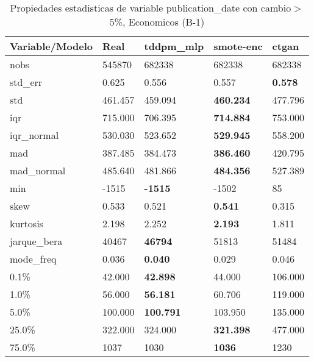 \begin{table}[H]
\centering
\fontsize{8}{14}\selectfont
\caption{Propiedades estadisticas de variable publication\_date con cambio\ensuremath{>}5\%, Economicos (B-1)}
\label{table-stats-economicos-b-1-publication_date-short}
\begin{tabular}{|l|m{10em}|m{10em}|m{10em}|m{10em}|}
\hline
 \rowcolor[gray]{0.8}
Variable/Modelo & Real & tddpm\_mlp & smote-enc & ctgan \\
\hline nobs & 545870 & 682338 & 682338 & 682338 \\
\hline std\_err & 0.625 & \cellcolor[rgb]{0.9, 0.54, 0.52} 0.556 & 0.557 & \bfseries 0.578 \\
\hline std & 461.457 & 459.094 & \bfseries 460.234 & \cellcolor[rgb]{0.9, 0.54, 0.52} 477.796 \\
\hline iqr & 715.000 & 706.395 & \bfseries 714.884 & \cellcolor[rgb]{0.9, 0.54, 0.52} 753.000 \\
\hline iqr\_normal & 530.030 & 523.652 & \bfseries 529.945 & \cellcolor[rgb]{0.9, 0.54, 0.52} 558.200 \\
\hline mad & 387.485 & 384.473 & \bfseries 386.460 & \cellcolor[rgb]{0.9, 0.54, 0.52} 420.795 \\
\hline mad\_normal & 485.640 & 481.866 & \bfseries 484.356 & \cellcolor[rgb]{0.9, 0.54, 0.52} 527.389 \\
\hline min & -1515 & \bfseries -1515 & -1502 & \cellcolor[rgb]{0.9, 0.54, 0.52} 85 \\
\hline skew & 0.533 & 0.521 & \bfseries 0.541 & \cellcolor[rgb]{0.9, 0.54, 0.52} 0.315 \\
\hline kurtosis & 2.198 & 2.252 & \bfseries 2.193 & \cellcolor[rgb]{0.9, 0.54, 0.52} 1.811 \\
\hline jarque\_bera & 40467 & \bfseries 46794 & \cellcolor[rgb]{0.9, 0.54, 0.52} 51813 & 51484 \\
\hline mode\_freq & 0.036 & \bfseries 0.040 & 0.029 & \cellcolor[rgb]{0.9, 0.54, 0.52} 0.046 \\
\hline 0.1\% & 42.000 & \bfseries 42.898 & 44.000 & \cellcolor[rgb]{0.9, 0.54, 0.52} 106.000 \\
\hline 1.0\% & 56.000 & \bfseries 56.181 & 60.706 & \cellcolor[rgb]{0.9, 0.54, 0.52} 119.000 \\
\hline 5.0\% & 100.000 & \bfseries 100.791 & 103.950 & \cellcolor[rgb]{0.9, 0.54, 0.52} 135.000 \\
\hline 25.0\% & 322.000 & 324.000 & \bfseries 321.398 & \cellcolor[rgb]{0.9, 0.54, 0.52} 477.000 \\
\hline 75.0\% & 1037 & 1030 & \bfseries 1036 & \cellcolor[rgb]{0.9, 0.54, 0.52} 1230 \\
\hline
\end{tabular}
\end{table}
